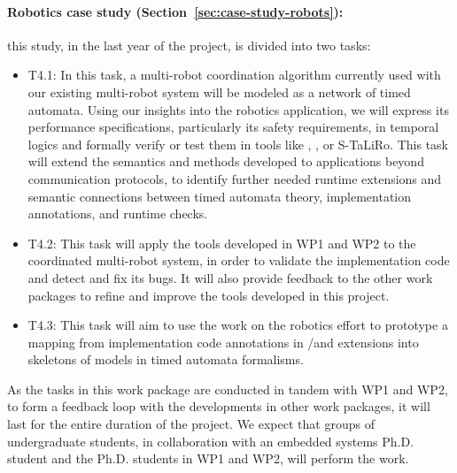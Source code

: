 \paragraph {Robotics case study (Section~\ref{sec:case-study-robots}):} this study, in the last year of the project, is divided into two tasks:
\noindent \begin{itemize}[labelsep=3pt,leftmargin=12pt]
  \item T4.1: In this task, a multi-robot coordination algorithm
    currently used with our existing multi-robot system will be
    modeled as a network of timed automata.  Using our insights into
    the robotics application, we will express its performance
    specifications, particularly its safety requirements, in temporal
    logics and formally verify or test them in tools like \uppaal,
    \prism, or S-TaLiRo.  This task will extend the semantics and
    methods developed to applications beyond communication protocols,
    to identify further needed runtime extensions and semantic
    connections between timed automata theory, implementation
    annotations, and runtime checks.
  \item T4.2: This task will apply the tools developed in WP1 and WP2
    to the coordinated multi-robot system, in order to validate the
    implementation code and detect and fix its bugs.  It will also
    provide feedback to the other work packages to refine and improve
    the tools developed in this project.
    \item T4.3: This task will aim to use the work on the robotics
      effort to prototype a mapping from implementation code
      annotations in \acsl/\eacsl and extensions into skeletons of
      models in timed automata formalisms.  
  \end{itemize}

As the tasks in this work package are conducted in tandem with WP1 and WP2, to form a feedback loop with the developments in other work packages, it will last for the entire duration of the project.
We expect that groups of undergraduate students, in collaboration with
an embedded systems Ph.D. student and the Ph.D. students in WP1 and WP2, will
perform the work.

